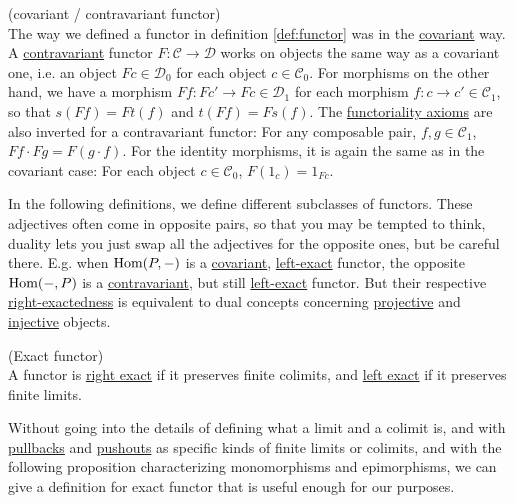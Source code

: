 \begin{definition}{(covariant / contravariant functor)}\\
The way we defined a functor in definition \ref{def:functor} was in the \ul{covariant} way.\\
A \ul{contravariant} functor $F : \mathcal{C} \rightarrow \mathcal{D}$ works on objects the same way as a covariant one, i.e.
an object $Fc \in \mathcal{D}_{0}$ for each object $c \in \mathcal{C}_{0}$. For morphisms on the other hand, we have
a morphism $F f : Fc' \rightarrow Fc \in \mathcal{D}_{1}$ for each morphism $f : c \rightarrow c' \in \mathcal{C}_{1}$, so that
$s(F f) = F t(f)$ and $t(F f) = F s(f)$.
The \ul{functoriality axioms} are also inverted for a contravariant functor:
For any composable pair, $f, g \in \mathcal{C}_{1}$, $F f \cdot F g = F(g \cdot f)$.
For the identity morphisms, it is again the same as in the covariant case:
For each object $c \in \mathcal{C}_{0}$, $F(1_{c}) = 1_{Fc}$.
\end{definition}

In the following definitions, we define different subclasses of functors. These adjectives often come in opposite pairs, so that you may be
tempted to think, duality lets you just swap all the adjectives for the opposite ones, but be careful there. E.g. when 
$\textup{Hom}(P,-)$ is a \ul{covariant}, \ul{left-exact} functor, the opposite $\textup{Hom}(-,P)$ is a \ul{contravariant}, but still \ul{left-exact} functor.
But their respective \ul{right-exactedness} is equivalent to dual concepts concerning \ul{projective} and \ul{injective} objects.

\begin{definition}{(Exact functor)}\label{def:exact_functor}\\
A functor is \ul{right exact} if it preserves finite colimits, and \ul{left exact} if it preserves finite limits.
\end{definition}

\begin{remark}
Without going into the details of defining what a limit and a colimit is, and with \ul{pullbacks} and \ul{pushouts} as specific kinds of
finite limits or colimits, and with the following proposition characterizing monomorphisms and epimorphisms,
we can give a definition for exact functor that is useful enough for our purposes.
\end{remark}

